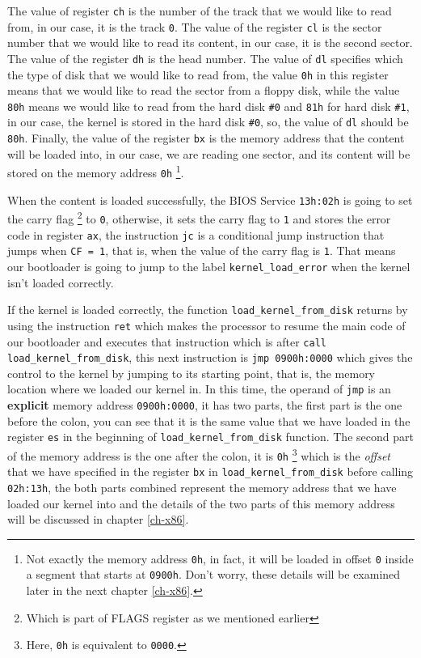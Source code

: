 The value of register \lstinline!ch! is the number of the track that we
would like to read from, in our case, it is the track \lstinline!0!. The
value of the register \lstinline!cl! is the sector number that we would
like to read its content, in our case, it is the second sector. The
value of the register \lstinline!dh! is the head number. The value of
\lstinline!dl! specifies which the type of disk that we would like to
read from, the value \lstinline!0h! in this register means that we would
like to read the sector from a floppy disk, while the value
\lstinline!80h! means we would like to read from the hard disk
\lstinline!#0! and \lstinline!81h! for hard disk \lstinline!#1!, in our
case, the kernel is stored in the hard disk \lstinline!#0!, so, the
value of \lstinline!dl! should be \lstinline!80h!. Finally, the value of
the register \lstinline!bx! is the memory address that the content will
be loaded into, in our case, we are reading one sector, and its content
will be stored on the memory address \lstinline!0h! \footnote{Not
  exactly the memory address \lstinline!0h!, in fact, it will be loaded
  in offset \lstinline!0! inside a segment that starts at
  \lstinline!0900h!. Don't worry, these details will be examined later
  in the next chapter \ref{ch-x86}.}.

When the content is loaded successfully, the BIOS Service
\lstinline!13h:02h! is going to set the carry flag \footnote{Which is
  part of FLAGS register as we mentioned earlier} to \lstinline!0!,
otherwise, it sets the carry flag to \lstinline!1! and stores the error
code in register \lstinline!ax!, the instruction \lstinline!jc! is a
conditional jump instruction that jumps when \lstinline!CF = 1!, that
is, when the value of the carry flag is \lstinline!1!. That means our
bootloader is going to jump to the label \lstinline!kernel_load_error!
when the kernel isn't loaded correctly.

If the kernel is loaded correctly, the function
\lstinline!load_kernel_from_disk! returns by using the instruction
\lstinline!ret! which makes the processor to resume the main code of our
bootloader and executes that instruction which is after
\lstinline!call load_kernel_from_disk!, this next instruction is
\lstinline!jmp 0900h:0000! which gives the control to the kernel by
jumping to its starting point, that is, the memory location where we
loaded our kernel in. In this time, the operand of \lstinline!jmp! is an
\textbf{explicit} memory address \lstinline!0900h:0000!, it has two
parts, the first part is the one before the colon, you can see that it
is the same value that we have loaded in the register \lstinline!es! in
the beginning of \lstinline!load_kernel_from_disk! function. The second
part of the memory address is the one after the colon, it is
\lstinline!0h! \footnote{Here, \lstinline!0h! is equivalent to
  \lstinline!0000!.} which is the \emph{offset} that we have specified
in the register \lstinline!bx! in \lstinline!load_kernel_from_disk!
before calling \lstinline!02h:13h!, the both parts combined represent
the memory address that we have loaded our kernel into and the details
of the two parts of this memory address will be discussed in chapter
\ref{ch-x86}.

